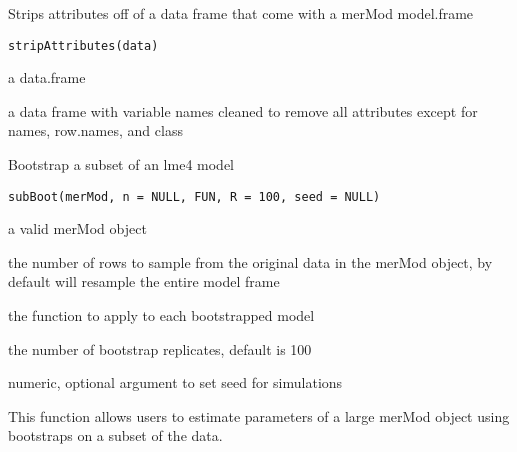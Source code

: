 \documentclass[letterpaper]{book}
\begin{document}
%
\begin{Description}\relax
Strips attributes off of a data frame that come with a merMod model.frame
\end{Description}
%
\begin{Usage}
\begin{verbatim}
stripAttributes(data)
\end{verbatim}
\end{Usage}
%
\begin{Arguments}
\begin{ldescription}
\item[\code{data}] a data.frame
\end{ldescription}
\end{Arguments}
%
\begin{Value}
a data frame with variable names cleaned to remove all attributes except for
names, row.names, and class
\end{Value}
%
\begin{Description}\relax
Bootstrap a subset of an lme4 model
\end{Description}
%
\begin{Usage}
\begin{verbatim}
subBoot(merMod, n = NULL, FUN, R = 100, seed = NULL)
\end{verbatim}
\end{Usage}
%
\begin{Arguments}
\begin{ldescription}
\item[\code{merMod}] a valid merMod object

\item[\code{n}] the number of rows to sample from the original data
in the merMod object, by default will resample the entire model frame

\item[\code{FUN}] the function to apply to each bootstrapped model

\item[\code{R}] the number of bootstrap replicates, default is 100

\item[\code{seed}] numeric, optional argument to set seed for simulations
\end{ldescription}
\end{Arguments}
%
\begin{Details}\relax
This function allows users to estimate parameters of a
large merMod object using bootstraps on a subset of the data.
\end{Details}
\end{document}
